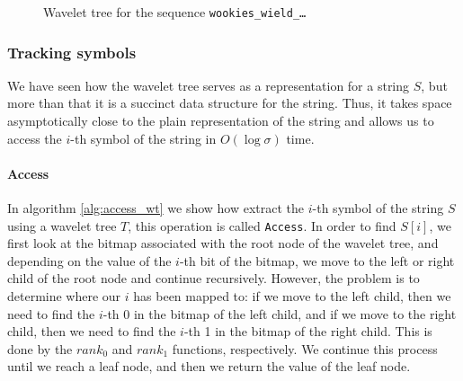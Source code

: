 \begin{figure}[h]
    \caption{\small Wavelet tree for the sequence \texttt{wookies\_wield\_\dots}} \label{fig:wavelet_tree_example}
\end{figure}

\subsubsection*{Tracking symbols}
We have seen how the wavelet tree serves as a representation for a string $S$, but more than that it is a succinct data structure for the string. Thus, it takes space asymptotically close to the plain representation of the string and allows us to access the $i$-th symbol of the string in $O(\log \sigma)$ time.

\paragraph{Access} In algorithm \ref{alg:access_wt} we show how extract the $i$-th symbol of the string $S$ using a wavelet tree $T$, this operation is called \texttt{Access}. In order to find $S[i]$, we first look at the bitmap associated with the root node of the wavelet tree, and depending on the value of the $i$-th bit of the bitmap, we move to the left or right child of the root node and continue recursively. However, the problem is to determine where our $i$ has been mapped to: if we move to the left child, then we need to find the $i$-th 0 in the bitmap of the left child, and if we move to the right child, then we need to find the $i$-th 1 in the bitmap of the right child. This is done by the $rank_0$ and $rank_1$ functions, respectively. We continue this process until we reach a leaf node, and then we return the value of the leaf node.


